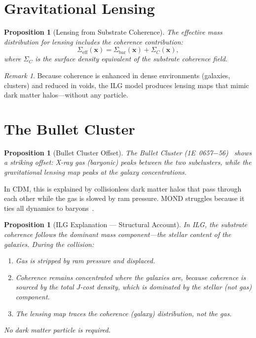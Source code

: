\documentclass[12pt,a4paper]{article}
\newtheorem{proposition}[theorem]{Proposition}
\theoremstyle{definition}
\theoremstyle{remark}
\newtheorem{remark}[theorem]{Remark}
\begin{document}
\section{Gravitational Lensing}
\label{sec:lensing}

\begin{proposition}[Lensing from Substrate Coherence]
\label{prop:lensing}
The effective mass distribution for lensing includes the
coherence contribution:
\begin{equation}
  \Sigma_{\mathrm{eff}}(\mathbf{x})
  = \Sigma_{\mathrm{bar}}(\mathbf{x})
  + \Sigma_C(\mathbf{x}),
\end{equation}
where $\Sigma_C$ is the surface density equivalent of the
substrate coherence field.
\end{proposition}

\begin{remark}
Because coherence is enhanced in dense environments (galaxies,
clusters) and reduced in voids, the ILG model produces lensing
maps that mimic dark matter halos---without any particle.
\end{remark}

\section{The Bullet Cluster}
\label{sec:bullet}

\begin{proposition}[Bullet Cluster Offset]
\label{prop:bullet}
The Bullet Cluster (1E~0657$-$56)~\cite{Clowe2006} shows a
striking offset: X-ray gas (baryonic) peaks between the two
subclusters, while the gravitational lensing map peaks at the
galaxy concentrations.
\end{proposition}

In CDM, this is explained by collisionless dark matter halos
that pass through each other while the gas is slowed by ram
pressure.  MOND struggles because it ties all dynamics to
baryons~\cite{Angus2006}.

\begin{proposition}[ILG Explanation --- Structural Account]
\label{thm:bullet}
In ILG, the substrate coherence follows the dominant mass
component---the stellar content of the galaxies.  During
the collision:
\begin{enumerate}
  \item Gas is stripped by ram pressure and displaced.
  \item Coherence remains concentrated where the galaxies
  are, because coherence is sourced by the total $J$-cost
  density, which is dominated by the stellar (not gas)
  component.
  \item The lensing map traces the coherence (galaxy)
  distribution, not the gas.
\end{enumerate}
No dark matter particle is required.
\end{proposition}
\end{document}

